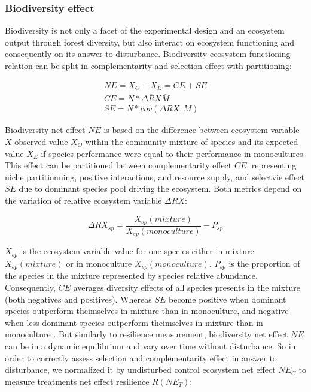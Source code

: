 \documentclass[12pt,]{article}
\theoremstyle{definition}
\theoremstyle{definition}
\theoremstyle{remark}
\begin{document}
\subsubsection{Biodiversity effect}\label{biodiversity-effect}

Biodiversity is not only a facet of the experimental design and an
ecosystem output through forest diversity, but also interact on
ecosystem functioning and consequently on its answer to disturbance.
Biodiversity ecosystem functioning relation can be split in
complementarity and selection effect with \citet{Loreau2001}
partitioning:

\begin{equation}
  \begin{array}{c}
    NE = X_O - X_E = CE + SE \\
    CE = N* \overline{\Delta RX} \overline{M}\\
    SE = N*cov(\Delta RX,M)
  \end{array}
  \label{eq:BiodivPart}
\end{equation}

Biodiversity net effect \(NE\) is based on the difference between
ecosystem variable \(X\) observed value \(X_O\) within the community
mixture of species and its expected value \(X_E\) if species performance
were equal to their performance in monocultures. This effect can be
partitioned between complementarity effect \(CE\), representing niche
partitionning, positive interactions, and resource supply, and selectvie
effect \(SE\) due to dominant species pool driving the ecosystem. Both
metrics depend on the variation of relative ecosystem variable
\(\Delta RX\):

\begin{equation}
  \Delta RX_{sp} = \frac{X_{sp}(mixture)}{X_{sp}(monoculture)} - P_{sp}
  \label{eq:DeltaRY}
\end{equation}

\(X_{sp}\) is the ecosystem variable value for one species either in
mixture \(X_{sp}(mixture)\) or in monoculture \(X_{sp}(monoculture)\).
\(P_{sp}\) is the proportion of the species in the mixture represented
by species relative abundance. Consequently, \(CE\) averages diversity
effects of all species presents in the mixture (both negatives and
positives). Whereas \(SE\) become positive when dominant species
outperform theimselves in mixture than in monoculture, and negative when
less dominant species outperform theimselves in mixture than in
monoculture \citep{Tobner2016}. But similarly to resilience measurement,
biodiversity net effect \(NE\) can be in a dynamic equilibrium and vary
over time without disturbance. So in order to correctly assess selection
and complementarity effect in answer to disturbance, we normalized it by
undisturbed control ecosystem net effect \(NE_C\) to measure treatments
net effect resilience \(R(NE_T)\):
\end{document}
